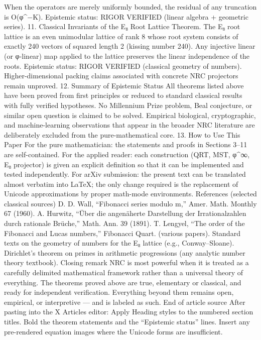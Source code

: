 {{{{{{When the operators are merely uniformly bounded, the residual of any truncation is O(φ^{−K}).
Epistemic status:
RIGOR VERIFIED (linear algebra + geometric series).
11. Classical Invariants of the E₈ Root Lattice
Theorem.
The E₈ root lattice is an even unimodular lattice of rank 8 whose root system consists of exactly 240 vectors of squared length 2 (kissing number 240).
Any injective linear (or φ-linear) map applied to the lattice preserves the linear independence of the roots.
Epistemic status:
RIGOR VERIFIED (classical geometry of numbers).
Higher-dimensional packing claims associated with concrete NRC projectors remain unproved.
12. Summary of Epistemic Status
All theorems listed above have been proved from first principles or reduced to standard classical results with fully verified hypotheses.
No Millennium Prize problem, Beal conjecture, or similar open question is claimed to be solved.
Empirical biological, cryptographic, and machine-learning observations that appear in the broader NRC literature are deliberately excluded from the pure-mathematical core.
13. How to Use This Paper
For the pure mathematician: the statements and proofs in Sections 3–11 are self-contained.
For the applied reader: each construction (QRT, MST, φ^∞, E₈ projector) is given an explicit definition so that it can be implemented and tested independently.
For arXiv submission: the present text can be translated almost verbatim into LaTeX; the only change required is the replacement of Unicode approximations by proper math-mode environments.
References (selected classical sources)
D. D. Wall, “Fibonacci series modulo m,” Amer. Math. Monthly 67 (1960).
A. Hurwitz, “Über die angenäherte Darstellung der Irrationalzahlen durch rationale Brüche,” Math. Ann. 39 (1891).
T. Lengyel, “The order of the Fibonacci and Lucas numbers,” Fibonacci Quart. (various papers).
Standard texts on the geometry of numbers for the E₈ lattice (e.g., Conway–Sloane).
Dirichlet’s theorem on primes in arithmetic progressions (any analytic number theory textbook).
Closing remark
NRC is most powerful when it is treated as a carefully delimited mathematical framework rather than a universal theory of everything. The theorems proved above are true, elementary or classical, and ready for independent verification. Everything beyond them remains open, empirical, or interpretive — and is labeled as such.
End of article source
After pasting into the X Articles editor:
Apply Heading styles to the numbered section titles.
Bold the theorem statements and the “Epistemic status” lines.
Insert any pre-rendered equation images where the Unicode forms are insufficient.
}}}}}}
